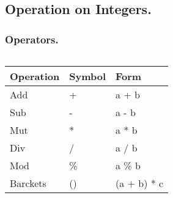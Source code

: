 \documentclass[
  11pt, %
  xcolor=dvipsnames
]{beamer}
\begin{document}
\subsection{Operation on Integers.}
\begin{frame}[fragile]
	\frametitle{Operators.}

	\begin{columns}
		\begin{column}{0.8\textwidth}

			\begin{table}
				\begin{tabular}{l l l}
					\toprule
					Operation & Symbol & Form        \\
					\midrule
					Add       & +      & a + b       \\
					Sub       & -      & a - b       \\
					Mut       & *      & a * b       \\
					Div       & /      & a / b       \\
					Mod       & \%     & a \% b      \\
					Barckets  & ()     & (a + b) * c \\
					\bottomrule
				\end{tabular}
			\end{table}

		\end{column}
	\end{columns}

\end{frame}
\end{document}
